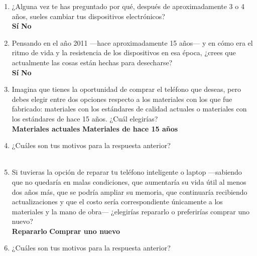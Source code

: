 \begin{enumerate}[resume]

    \item ¿Alguna vez te has preguntado por qué, después de aproximadamente 3 o
    4 años, sueles cambiar tus dispositivos electrónicos? \\
    \textbf{Sí} \quad \textbf{No}

    \item Pensando en el año 2011 —hace aproximadamente 15 años— y en cómo era
    el ritmo de vida y la resistencia de los dispositivos en esa época, ¿crees
    que actualmente las cosas están hechas para desecharse? \\
    \textbf{Sí} \quad \textbf{No}

    \item Imagina que tienes la oportunidad de comprar el teléfono que deseas,
    pero debes elegir entre dos opciones respecto a los materiales con los que
    fue fabricado: materiales con los estándares de calidad actuales o
    materiales con los estándares de hace 15 años. ¿Cuál elegirías? \\
    \textbf{Materiales actuales} \quad \textbf{Materiales de hace 15 años}

    \item ¿Cuáles son tus motivos para la respuesta anterior? \\
    \underline{\hspace{\linewidth}} \\
    \underline{\hspace{\linewidth}}

    \item Si tuvieras la opción de reparar tu teléfono inteligente o laptop
    —sabiendo que no quedaría en malas condiciones, que aumentaría su vida útil
    al menos dos años más, que se podría ampliar su memoria, que continuaría
    recibiendo actualizaciones y que el costo sería correspondiente únicamente a
    los materiales y la mano de obra— ¿elegirías repararlo o preferirías comprar
    uno nuevo? \\
    \textbf{Repararlo} \quad \textbf{Comprar uno nuevo}

    \item ¿Cuáles son tus motivos para la respuesta anterior? \\
    \underline{\hspace{\linewidth}} \\
    \underline{\hspace{\linewidth}}


\end{enumerate}
